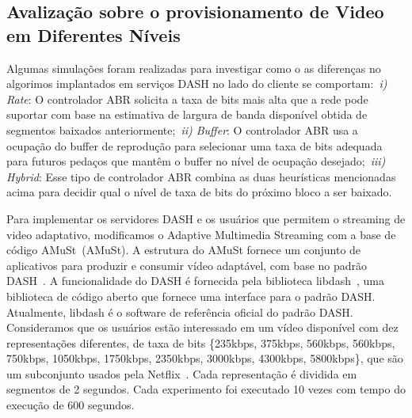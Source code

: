 \subsection{Avalização sobre o provisionamento de Video em Diferentes Níveis}
\label{subsec:evaluation}

Algumas simulações foram realizadas para investigar como o as diferenças no algorimos implantados em serviços DASH no lado do cliente se comportam:~\textit{i) Rate}: O controlador ABR solicita a taxa de bits mais alta
que a rede pode suportar com base na estimativa de largura de banda disponível obtida de segmentos baixados anteriormente;~\textit{ii) Buffer}: O controlador ABR usa a ocupação do buffer de reprodução para selecionar uma taxa de bits adequada para futuros pedaços que mantêm o buffer no nível de ocupação desejado;~\textit{iii) Hybrid}: Esse tipo de controlador ABR combina as duas heurísticas mencionadas acima para decidir qual o nível de taxa de bits do próximo bloco a ser baixado.
 


Para implementar os servidores DASH e os usuários que permitem o streaming de video adaptativo, modificamos o Adaptive Multimedia Streaming com a base de código AMuSt~(AMuSt).
A estrutura do AMuSt fornece um conjunto de aplicativos para produzir e consumir vídeo adaptável, com base no padrão DASH~\cite{kreuzberger2016amust}. A funcionalidade do DASH é fornecida pela biblioteca libdash~\cite{mueller2013ICMEW}, uma biblioteca de código aberto que fornece uma interface para o padrão DASH. Atualmente, libdash é o software de referência oficial do padrão DASH.
Consideramos que os usuários estão interessado em um vídeo disponível com dez representações diferentes, de taxa de bits \{235kbps, 375kbps, 560kbps, 560kbps, 750kbps, 1050kbps, 1750kbps, 2350kbps, 3000kbps, 4300kbps, 5800kbps\}, que são um subconjunto usados pela Netflix~\cite{netflix:representation}.
Cada representação é dividida em segmentos de 2 segundos. Cada experimento foi executado 10 vezes com tempo do execução de 600 segundos.


